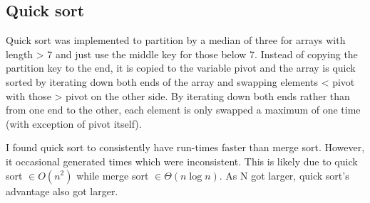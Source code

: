 \documentclass[12pt]{article}
\begin{document}
\subsection{Quick sort}

Quick sort was implemented to partition by a median of three for arrays with
length > 7 and just use the middle key for those below 7. Instead of copying the
partition key to the end, it is copied to the variable pivot and the
array is quick sorted by iterating down both ends of the array and
swapping elements < pivot with those > pivot on the other side. By
iterating down both ends rather than from one end to the other, each
element is only swapped a maximum of one time (with exception of pivot
itself).

I found quick sort to consistently have run-times faster than merge
sort. However, it occasional generated times which were
inconsistent. This is likely due to quick sort $\in O(n^2)$ while
merge sort $\in \Theta(n \log{n})$. As N got larger, quick sort's
advantage also got larger.
\end{document}
